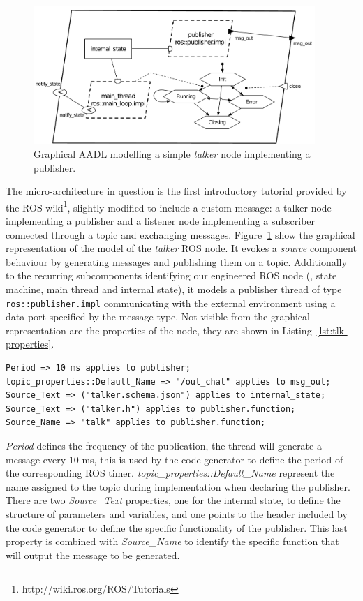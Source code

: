 \begin{figure}[t]
\centering
\includegraphics[width=0.95\textwidth]{gfx/usecase-publisher}
\caption{Graphical AADL modelling a simple \textit{talker} node implementing a publisher.}\label{fig:usecase-publisher}
\end{figure}

The micro-architecture in question is the first introductory tutorial provided by the ROS wiki\footnote{http://wiki.ros.org/ROS/Tutorials}, slightly modified to include a custom message: a talker node implementing a publisher and a listener node implementing a subscriber connected through a topic and exchanging messages. Figure~\ref{fig:usecase-publisher} show the graphical representation of the model of the \textit{talker} ROS node. It evokes a \textit{source} component behaviour by generating messages and publishing them on a topic. Additionally to the recurring subcomponents identifying our engineered ROS node (\ie, state machine, main thread and internal state), it models a publisher thread of type \texttt{ros::publisher.impl} communicating with the external environment using a data port specified by the message type. Not visible from the graphical representation are the properties of the node, they are shown in Listing~\ref{lst:tlk-properties}.

\begin{lstlisting}[language=AADL,caption={Properties of the talker node.},label=lst:tlk-properties]
Period => 10 ms applies to publisher;
topic_properties::Default_Name => "/out_chat" applies to msg_out;
Source_Text => ("talker.schema.json") applies to internal_state;
Source_Text => ("talker.h") applies to publisher.function;
Source_Name => "talk" applies to publisher.function;
\end{lstlisting}

\textit{Period} defines the frequency of the publication, the thread will generate a message every 10 ms, this is used by the code generator to define the period of the corresponding ROS timer. \textit{topic\_properties::Default\_Name} represent the name assigned to the topic during implementation when declaring the publisher. There are two \textit{Source\_Text} properties, one for the internal state, to define the structure of parameters and variables, and one points to the header included by the code generator to define the specific functionality of the publisher. This last property is combined with \textit{Source\_Name} to identify the specific function that will output the message to be generated.

